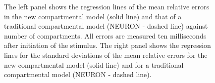 \begin{figure}[!h]
\centering
\parbox{5.8in}{\caption{\label{mean} The left panel shows the
regression lines of the mean relative errors in the new
compartmental model (solid line) and that of a traditional
compartmental model (NEURON - dashed line) against number of
compartments. All errors are measured ten milliseconds after
initiation of the stimulus. The right panel shows the regression
lines for the standard deviations of the mean relative errors for
the new compartmental model (solid line) and for a traditional
compartmental model (NEURON - dashed line).}}
\end{figure}

